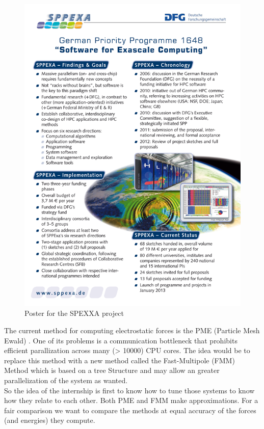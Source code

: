 \documentclass[11pt,twoside,a4paper]{report}
\begin{document}
\begin{figure}[H]
\includegraphics[scale=2]{sppexa-poster}
 \centering 
\caption{Poster for the SPEXXA project}
\label{fig:poster}
\end{figure}


The current method for computing electrostatic forces is the PME (Particle Mesh Ewald) \cite{darden1993particle}. One of its problems is a communication bottleneck that prohibits efficient parallization across many (> 10000) CPU cores. The idea would be to replace this method with a new method called the Fast-Multipole (FMM) Method which is based on a tree Structure and may allow an greater parallelization of the system as wanted.\\

So the idea of the internship is first to know how to tune those systems to know how they relate to each other. Both PME and FMM make approximations. For a fair comparison we want to compare the methods at equal accuracy of the forces (and energies) they compute. 
\end{document}
